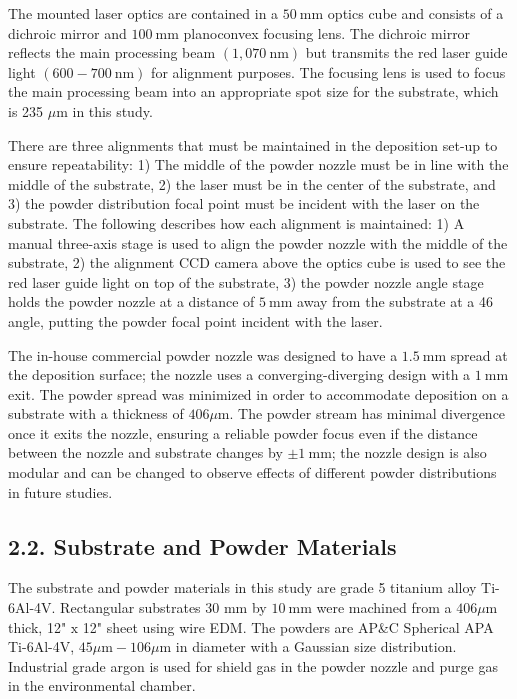 \documentclass[10pt]{article}
\begin{document}
The mounted laser optics are contained in a $50 \mathrm{~mm}$ optics cube and consists of a dichroic mirror and $100 \mathrm{~mm}$ planoconvex focusing lens. The dichroic mirror reflects the main processing beam $(1,070 \mathrm{~nm})$ but transmits the red laser guide light $(600-700 \mathrm{~nm})$ for alignment purposes. The focusing lens is used to focus the main processing beam into an appropriate spot size for the substrate, which is 235 $\mu \mathrm{m}$ in this study.

There are three alignments that must be maintained in the deposition set-up to ensure repeatability: 1) The middle of the powder nozzle must be in line with the middle of the substrate, 2) the laser must be in the center of the substrate, and 3) the powder distribution focal point must be incident with the laser on the substrate. The following describes how each alignment is maintained: 1) A manual three-axis stage is used to align the powder nozzle with the middle of the substrate, 2) the alignment CCD camera above the optics cube is used to see the red laser guide light on top of the substrate, 3) the powder nozzle angle stage holds the powder nozzle at a distance of $5 \mathrm{~mm}$ away from the substrate at a 46 angle, putting the powder focal point incident with the laser.

The in-house commercial powder nozzle was designed to have a $1.5 \mathrm{~mm}$ spread at the deposition surface; the nozzle uses a converging-diverging design with a $1 \mathrm{~mm}$ exit. The powder spread was minimized in order to accommodate deposition on a substrate with a thickness of $406 \mu \mathrm{m}$. The powder stream has minimal divergence once it exits the nozzle, ensuring a reliable powder focus even if the distance between the nozzle and substrate changes by $\pm 1 \mathrm{~mm}$; the nozzle design is also modular and can be changed to observe effects of different powder distributions in future studies.

\subsection*{2.2. Substrate and Powder Materials}
The substrate and powder materials in this study are grade 5 titanium alloy Ti-6Al-4V. Rectangular substrates 30 $\mathrm{mm}$ by $10 \mathrm{~mm}$ were machined from a $406 \mu \mathrm{m}$ thick, 12" $\mathrm{x}$ 12" sheet using wire EDM. The powders are AP\&C Spherical APA Ti-6Al-4V, $45 \mu \mathrm{m}-106 \mu \mathrm{m}$ in diameter with a Gaussian size distribution. Industrial grade argon is used for shield gas in the powder nozzle and purge gas in the environmental chamber.
\end{document}
